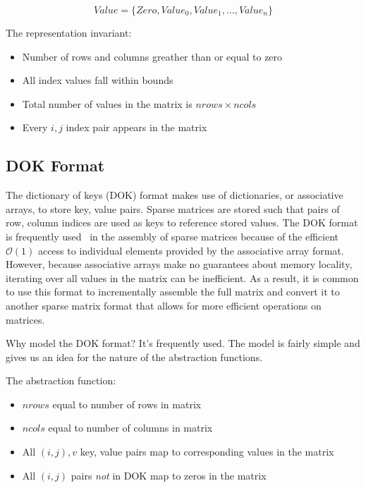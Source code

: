 \documentclass[11pt,conference]{IEEEtran}
\begin{document}
\begin{displaymath}
Value = \{Zero, Value_0, Value_1, \ldots, Value_n\}
\end{displaymath}



The representation invariant:

\begin{itemize}
	\item Number of rows and columns greather than or equal to zero
	\item All index values fall within bounds
	\item Total number of values in the matrix is \(nrows \times ncols\)
	\item Every \(i, j\) index pair appears in the matrix
\end{itemize}

\subsection{DOK Format}

The dictionary of keys (DOK) format makes use of dictionaries, or associative arrays, to store key, value pairs.  Sparse matrices are stored such that pairs of row, column indices are used as keys to reference stored values.  The DOK format is frequently used~\cite{scipy, eigenweb2010} in the assembly of sparse matrices because of the efficient \(\mathcal{O}(1)\) access to individual elements provided by the associative array format.  However, because associative arrays make no guarantees about memory locality, iterating over all values in the matrix can be inefficient.  As a result, it is common to use this format to incrementally assemble the full matrix and convert it to another sparse matrix format that allows for more efficient operations on matrices.

Why model the DOK format?  It's frequently used.  The model is fairly simple and gives us an idea for the nature of the abstraction functions. 

The abstraction function:

\begin{itemize}
  \item \(nrows\) equal to number of rows in matrix
  \item \(ncols\) equal to number of columns in matrix
  \item All \((i, j), v\) key, value pairs map to corresponding values in the matrix
  \item All \((i, j)\) pairs \emph{not} in DOK map to zeros in the matrix
\end{itemize}
\end{document}
